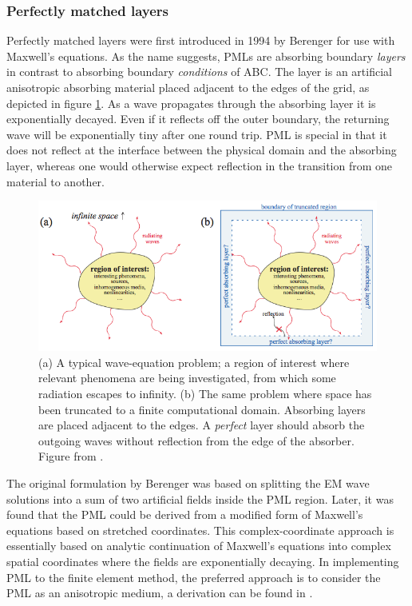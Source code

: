 \subsubsection*{Perfectly matched layers}
Perfectly matched layers were first introduced in 1994 by Berenger\cite{PML_Berenger} for use with Maxwell's equations. As the name suggests, PMLs are absorbing boundary \emph{layers} in contrast to absorbing boundary \emph{conditions} of ABC. The layer is an artificial anisotropic absorbing material placed adjacent to the edges of the grid, as depicted in figure \ref{fig:PML_region}. As a wave propagates through the absorbing layer it is exponentially decayed. Even if it reflects off the outer boundary, the returning wave will be exponentially tiny after one round trip. PML is special in that it does not reflect at the interface between the physical domain and the absorbing layer, whereas one would otherwise expect reflection in the transition from one material to another\cite{web:PML_MIT}.

\begin{figure}[htb]
    \centering
    \includegraphics[width=0.9\linewidth]{figures/Ch2/PML_region.png}
    \caption{(a) A typical wave-equation problem; a region of interest where relevant phenomena are being investigated, from which some radiation escapes to infinity. (b) The same problem where space has been truncated to a finite computational domain. Absorbing layers are placed adjacent to the edges. A \emph{perfect} layer should absorb the outgoing waves without reflection from the edge of the absorber. Figure from \cite{web:PML_MIT}.}
    \label{fig:PML_region}
\end{figure}

The original formulation by Berenger\cite{PML_Berenger} was based on splitting the EM wave solutions into a sum of two artificial fields inside the PML region. Later, it was found that the PML could be derived from a modified form of Maxwell's equations based on stretched coordinates\cite{PML_coordstretch}. This complex-coordinate approach is essentially based on analytic continuation of Maxwell's equations into complex spatial coordinates where the fields are exponentially decaying\cite{web:PML_MIT}. In implementing PML to the finite element method, the preferred approach is to consider the PML as an anisotropic medium, a derivation can be found in \cite{FEM_TheoryAndCompOfEM_Jian-Ming_Jin}. 

